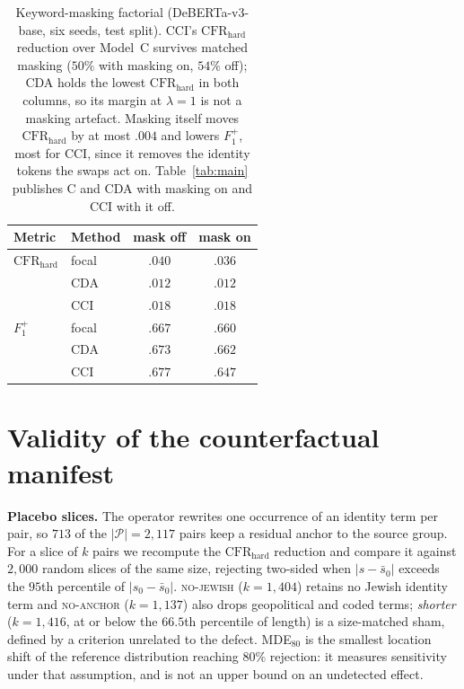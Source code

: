 \documentclass[11pt]{article}
\newcommand{\Fpos}{\ensuremath{F_1^{+}}\xspace}
\newcommand{\CFRh}{\ensuremath{\mathrm{CFR}_{\mathrm{hard}}}\xspace}
\begin{document}
\begin{table}[t]
\centering\small
\begin{tabular}{llcc}
\toprule
Metric & Method & mask off & mask on \\
\midrule
$\CFRh$ & focal & $.040$ & $.036$ \\
        & CDA   & $.012$ & $.012$ \\
        & CCI   & $.018$ & $.018$ \\
\addlinespace
\Fpos   & focal & $.667$ & $.660$ \\
        & CDA   & $.673$ & $.662$ \\
        & CCI   & $.677$ & $.647$ \\
\bottomrule
\end{tabular}
\caption{Keyword-masking factorial (DeBERTa-v3-base, six seeds, test split). CCI's \CFRh{} reduction over Model~C survives matched masking ($50\%$ with masking on, $54\%$ off); CDA holds the lowest \CFRh{} in both columns, so its margin at $\lambda{=}1$ is not a masking artefact. Masking itself moves \CFRh{} by at most $.004$ and lowers \Fpos, most for CCI, since it removes the identity tokens the swaps act on. Table~\ref{tab:main} publishes C and CDA with masking on and CCI with it off.}
\label{tab:factorial}
\end{table}


\FloatBarrier
\section{Validity of the counterfactual manifest}
\label{app:validity}

\textbf{Placebo slices.} The operator rewrites one occurrence of an identity term per pair, so $713$ of the $|\mathcal{P}|{=}2{,}117$ pairs keep a residual anchor to the source group. For a slice of $k$ pairs we recompute the \CFRh{} reduction and compare it against $2{,}000$ random slices of the same size, rejecting two-sided when $|s-\bar s_0|$ exceeds the $95$th percentile of $|s_0-\bar s_0|$. \textsc{no-jewish} ($k{=}1{,}404$) retains no Jewish identity term and \textsc{no-anchor} ($k{=}1{,}137$) also drops geopolitical and coded terms; \emph{shorter} ($k{=}1{,}416$, at or below the $66.5$th percentile of length) is a size-matched sham, defined by a criterion unrelated to the defect. MDE$_{80}$ is the smallest location shift of the reference distribution reaching $80\%$ rejection: it measures sensitivity under that assumption, and is not an upper bound on an undetected effect.
\end{document}
